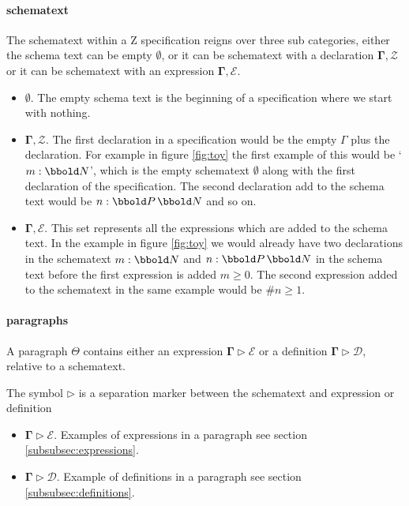 \paragraph{schematext}
\label{subsubsec:schematext}

The schematext within a Z specification reigns over three sub categories,
either the schema text can be empty $\emptyset$, or it can be schematext with a
declaration $\mathbf{\Gamma}, \mathcal{Z}$ or it can be schematext with an
expression $\mathbf{\Gamma}, \mathcal{E}$.

\begin{itemize}
\item $\emptyset$. The empty schema text is the beginning of a specification
where we start with nothing.

\item $\mathbf{\Gamma}, \mathcal{Z}$. The first declaration in a specification
would be the empty $\Gamma$ plus the declaration. For example in figure
\ref{fig:toy} the first example of this would be `$m:\nat$', which is the empty
schematext $\emptyset$ along with the first declaration of the specification.
The second declaration add to the schema text would be $n:\power \nat$ and so
on.

\item $\mathbf{\Gamma}, \mathcal{E}$. This set represents all the expressions
which are added to the schema text. In the example in figure \ref{fig:toy} we
would already have two declarations in the schematext $m:\nat$ and $n:\power
\nat$ in the schema text before the first expression is added $m \geq 0$. The
second expression added to the schematext in the same example would be $\# n
\geq 1$. 

\end{itemize}

\paragraph{paragraphs}
\label{subsubsec:paragraphs}

A paragraph $\Theta$ contains either an expression $\mathbf{\Gamma}
\triangleright \mathcal{E}$ or a definition $\mathbf{\Gamma} \triangleright
\mathcal{D}$, relative to a schematext.

The symbol $\triangleright$ is a separation marker between the schematext and
expression or definition

\begin{itemize}
\item $\mathbf{\Gamma} \triangleright \mathcal{E}$. Examples of expressions in a
paragraph see section \ref{subsubsec:expressions}.

\item $\mathbf{\Gamma} \triangleright \mathcal{D}$. Example of definitions in a
paragraph see section \ref{subsubsec:definitions}.
\end{itemize}

